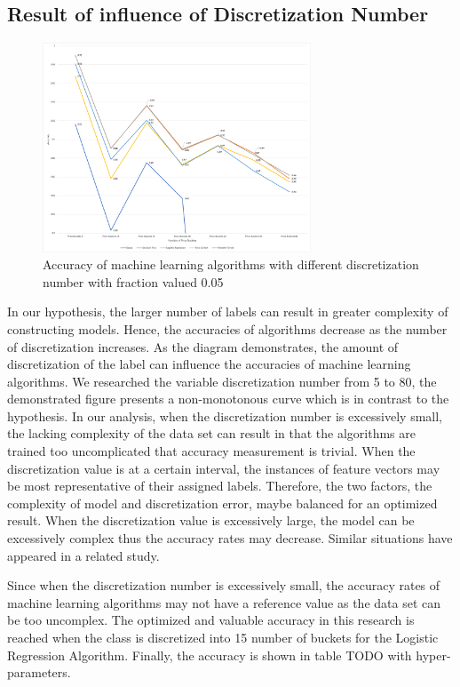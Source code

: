 \documentclass[conference]{IEEEtran}
\begin{document}
\subsection{Result of influence of Discretization Number}
\begin{figure}[ht] 
\centering
\includegraphics[width=8cm]{03.png}
\caption{Accuracy of machine learning algorithms with different discretization number with fraction valued 0.05}
\end{figure}

In our hypothesis, the larger number of labels can result in greater complexity of constructing models. Hence, the accuracies of algorithms decrease as the number of discretization increases. As the diagram demonstrates, the amount of discretization of the label can influence the accuracies of machine learning algorithms. We researched the variable discretization number from 5 to 80, the demonstrated figure presents a non-monotonous curve which is in contrast to the hypothesis. In our analysis, when the discretization number is excessively small, the lacking complexity of the data set can result in that the algorithms are trained too uncomplicated that accuracy measurement is trivial. When the discretization value is at a certain interval, the instances of feature vectors may be most representative of their assigned labels. Therefore, the two factors, the complexity of model and discretization error, maybe balanced for an optimized result. When the discretization value is excessively large, the model can be excessively complex thus the accuracy rates may decrease. Similar situations have appeared in a related study\cite{b30}.

Since when the discretization number is excessively small, the accuracy rates of machine learning algorithms may not have a reference value as the data set can be too uncomplex. The optimized and valuable accuracy in this research is reached when the class is discretized into 15 number of buckets for the Logistic Regression Algorithm. Finally, the accuracy is shown in table TODO with hyper-parameters.
\end{document}
